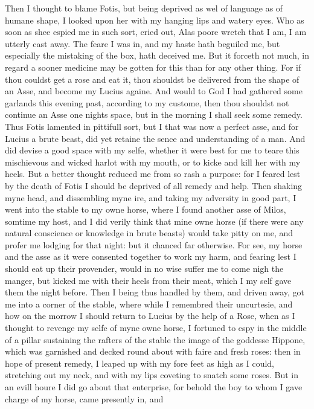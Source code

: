 Then I thought to blame Fotis, but being deprived as wel of language as of
humane shape, I looked upon her with my hanging lips and watery eyes. Who as
soon as shee espied me in such sort, cried out, Alas poore wretch that I am, I
am utterly cast away. The feare I was in, and my haste hath beguiled me, but
especially the mistaking of the box, hath deceived me. But it forceth not much,
in regard a sooner medicine may be gotten for this than for any other thing.
For if thou couldst get a rose and eat it, thou shouldst be delivered from the
shape of an Asse, and become my Lucius againe. And would to God I had gathered
some garlands this evening past, according to my custome, then thou shouldst
not continue an Asse one nights space, but in the morning I shall seek some
remedy. Thus Fotis lamented in pittifull sort, but I that was now a perfect
asse, and for Lucius a brute beast, did yet retaine the sence and understanding
of a man. And did devise a good space with my selfe, whether it were best for
me to teare this mischievous and wicked harlot with my mouth, or to kicke and
kill her with my heels. But a better thought reduced me from so rash a purpose:
for I feared lest by the death of Fotis I should be deprived of all remedy and
help. Then shaking myne head, and dissembling myne ire, and taking my adversity
in good part, I went into the stable to my owne horse, where I found another
asse of Milos, somtime my host, and I did verily think that mine owne horse (if
there were any natural conscience or knowledge in brute beasts) would take
pitty on me, and profer me lodging for that night: but it chanced far
otherwise. For see, my horse and the asse as it were consented together to work
my harm, and fearing lest I should eat up their provender, would in no wise
suffer me to come nigh the manger, but kicked me with their heels from their
meat, which I my self gave them the night before. Then I being thus handled by
them, and driven away, got me into a corner of the stable, where while I
remembred their uncurtesie, and how on the morrow I should return to Lucius by
the help of a Rose, when as I thought to revenge my selfe of myne owne horse, I
fortuned to espy in the middle of a pillar sustaining the rafters of the stable
the image of the goddesse Hippone, which was garnished and decked round about
with faire and fresh roses: then in hope of present remedy, I leaped up with my
fore feet as high as I could, stretching out my neck, and with my lips coveting
to snatch some roses. But in an evill houre I did go about that enterprise, for
behold the boy to whom I gave charge of my horse, came presently in, and
